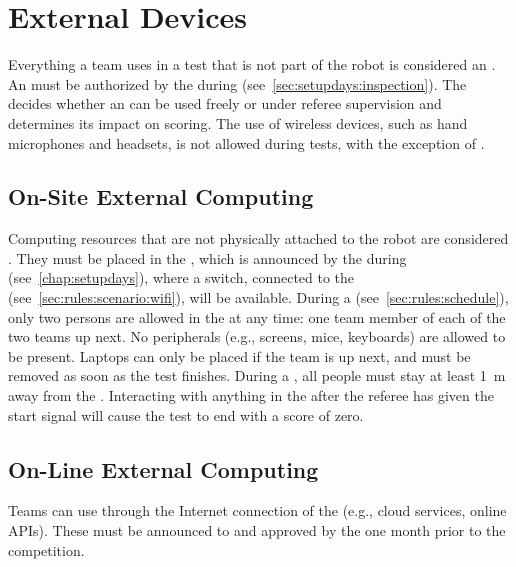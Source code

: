 %
%
\section{External Devices}
\label{sec:rules:externaldevices}
Everything a team uses in a test that is not part of the robot is considered an \ExternalDevice{}.
An \ExternalDevice{} must be authorized by the \TC{} during \RobotInspection{} (see~\ref{sec:setupdays:inspection}).
The  decides whether an \ExternalDevice{} can be used freely or under referee supervision and determines its impact on scoring.
The use of wireless devices, such as hand microphones and headsets, is not allowed during tests, with the exception of \ExternalComputing{}.

\subsection{On-Site External Computing}
\label{sec:rules:onsiteexternalcomputing}
Computing resources that are not physically attached to the robot are considered \ExternalComputing{}.
They must be placed in the \ECRA{}, which is announced by the \TC{} during \SetupDays{} (see~\ref{chap:setupdays}), where a switch, connected to the \ArenaNetwork{} (see~\ref{sec:rules:scenario:wifi}), will be available.
During a \Testblock{} (see~\ref{sec:rules:schedule}), only two persons are allowed in the  at any time: one team member of each of the two teams up next. No peripherals (e.g., screens, mice, keyboards) are allowed to be present. Laptops can only be placed if the team is up next, and must be removed as soon as the test finishes.
During a \Testslot{}, all people must stay at least \SI{1}{\meter} away from the .
Interacting with anything in the  after the referee has given the start signal will cause the test to end with a score of zero.


\subsection{On-Line External Computing}
\label{sec:rules:onlineexternalcomputing}
Teams can use \ExternalComputing{} through the Internet connection of the \ArenaNetwork{} (e.g., cloud services, online APIs). These must be announced to and approved by the \TC{} one month prior to the competition.

